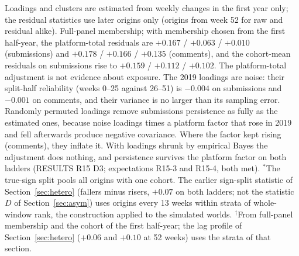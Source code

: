 \documentclass[10pt]{article}
\begin{document}
Loadings and clusters are estimated from weekly changes in the first year only; the residual statistics use later origins only (origins from week 52 for raw and residual alike). Full-panel membership; with membership chosen from the first half-year, the platform-total residuals are $+0.167$ / $+0.063$ / $+0.010$ (submissions) and $+0.178$ / $+0.166$ / $+0.135$ (comments), and the cohort-mean residuals on submissions rise to $+0.159$ / $+0.112$ / $+0.102$. The platform-total adjustment is not evidence about exposure. The 2019 loadings are noise: their split-half reliability (weeks 0--25 against 26--51) is $-0.004$ on submissions and $-0.001$ on comments, and their variance is no larger than its sampling error. Randomly permuted loadings remove submissions persistence as fully as the estimated ones, because noise loadings times a platform factor that rose in 2019 and fell afterwards produce negative covariance. Where the factor kept rising (comments), they inflate it. With loadings shrunk by empirical Bayes the adjustment does nothing, and persistence survives the platform factor on both ladders (RESULTS R15 D3; expectations R15-3 and R15-4, both met). $^\ast$The true-sign split pools all origins with one cohort. The earlier sign-split statistic of Section~\ref{sec:hetero} (fallers minus risers, $+0.07$ on both ladders; not the statistic $D$ of Section~\ref{sec:asym}) uses origins every 13 weeks within strata of whole-window rank, the construction applied to the simulated worlds. $^\dagger$From full-panel membership and the cohort of the first half-year; the lag profile of Section~\ref{sec:hetero} ($+0.06$ and $+0.10$ at 52 weeks) uses the strata of that section.
\end{document}
